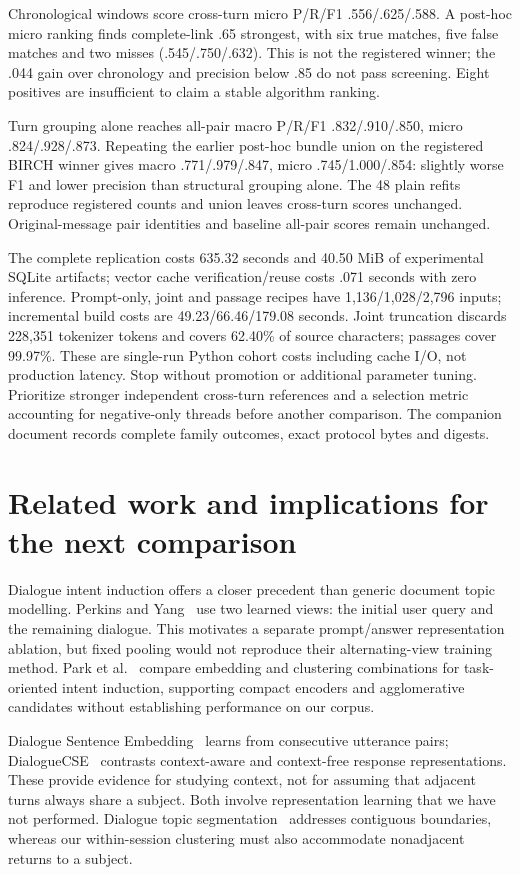 \documentclass[11pt]{article}
\begin{document}
Chronological windows score cross-turn micro P/R/F1 .556/.625/.588. A post-hoc
micro ranking finds complete-link .65 strongest, with six true matches, five
false matches and two misses (.545/.750/.632). This is not the registered
winner; the .044 gain over chronology and precision below .85 do not pass
screening. Eight positives are insufficient to claim a stable algorithm ranking.

Turn grouping alone reaches all-pair macro P/R/F1 .832/.910/.850, micro
.824/.928/.873. Repeating the earlier post-hoc bundle union on the registered
BIRCH winner gives macro .771/.979/.847, micro .745/1.000/.854: slightly worse
F1 and lower precision than structural grouping alone. The 48 plain refits
reproduce registered counts and union leaves cross-turn scores unchanged.
Original-message pair identities and baseline all-pair scores remain unchanged.

The complete replication costs 635.32 seconds and 40.50 MiB of experimental
SQLite artifacts; vector cache verification/reuse costs .071 seconds with zero
inference. Prompt-only, joint and passage recipes have 1,136/1,028/2,796 inputs;
incremental build costs are 49.23/66.46/179.08 seconds. Joint truncation discards
228,351 tokenizer tokens and covers 62.40\% of source characters; passages
cover 99.97\%. These are single-run Python cohort costs including cache I/O,
not production latency. Stop without promotion or additional parameter tuning.
Prioritize stronger independent cross-turn references and a selection metric
accounting for negative-only threads before another comparison. The companion
document records complete family outcomes, exact protocol bytes and digests.

\section{Related work and implications for the next comparison}
Dialogue intent induction offers a closer precedent than generic document
topic modelling. Perkins and Yang~\cite{multiview} use two learned views: the
initial user query and the remaining dialogue. This motivates a separate
prompt/answer representation ablation, but fixed pooling would not reproduce
their alternating-view training method. Park et al.~\cite{intentanalysis}
compare embedding and clustering combinations for task-oriented intent
induction, supporting compact encoders and agglomerative candidates without
establishing performance on our corpus.

Dialogue Sentence Embedding~\cite{dse} learns from consecutive utterance pairs;
DialogueCSE~\cite{dialoguecse} contrasts context-aware and context-free response
representations. These provide evidence for studying context, not for assuming
that adjacent turns always share a subject. Both involve representation
learning that we have not performed. Dialogue topic segmentation~\cite{xing}
addresses contiguous boundaries, whereas our within-session clustering must
also accommodate nonadjacent returns to a subject.
\end{document}
